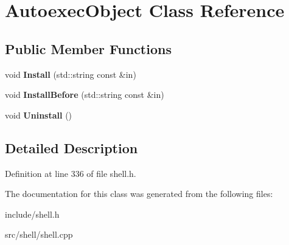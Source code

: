 \hypertarget{classAutoexecObject}{\section{Autoexec\-Object Class Reference}
\label{classAutoexecObject}
}
\subsection*{Public Member Functions}
\begin{DoxyCompactItemize}
\item 
\hypertarget{classAutoexecObject_a30b975e4cf89783c6e56025c60479ca1}{void {\bfseries Install} (std\-::string const \&in)}\label{classAutoexecObject_a30b975e4cf89783c6e56025c60479ca1}

\item 
\hypertarget{classAutoexecObject_a006d09ad8eef5bc34e1d72778a96cce6}{void {\bfseries Install\-Before} (std\-::string const \&in)}\label{classAutoexecObject_a006d09ad8eef5bc34e1d72778a96cce6}

\item 
\hypertarget{classAutoexecObject_a62d93cd9fdbf05b70f05410ae7bb73df}{void {\bfseries Uninstall} ()}\label{classAutoexecObject_a62d93cd9fdbf05b70f05410ae7bb73df}

\end{DoxyCompactItemize}


\subsection{Detailed Description}


Definition at line 336 of file shell.\-h.



The documentation for this class was generated from the following files\-:\begin{DoxyCompactItemize}
\item 
include/shell.\-h\item 
src/shell/shell.\-cpp\end{DoxyCompactItemize}
